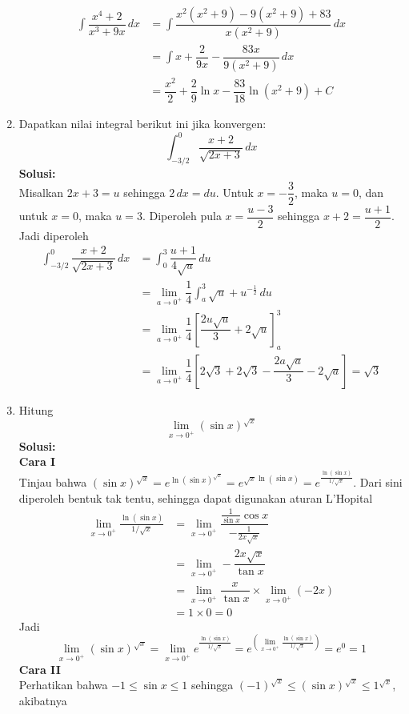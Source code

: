 \documentclass{article}
\begin{document}
\begin{enumerate}
\begin{align*}
	\int \dfrac{x^4+2}{x^3+9x}\, dx &= \int \dfrac{x^2(x^2+9)-9(x^2+9)+83}{x(x^2+9)}\, dx\\
	&= \int x + \dfrac{2}{9x} -\dfrac{83x}{9(x^2+9)}\, dx\\
	&= \dfrac{x^2}{2}+\dfrac{2}{9}\ln x-\dfrac{83}{18}\ln(x^2+9) + C
	\end{align*}
	\item Dapatkan nilai integral berikut ini jika konvergen:
	$$ \int_{-3/2}^0 \dfrac{x+2}{\sqrt{2x+3}}\, dx$$
	\textbf{Solusi:}\\
	Misalkan $2x+3=u$ sehingga $2\, dx=du$. Untuk $x=-\dfrac{3}{2}$, maka $u=0$, dan untuk $x=0$, maka $u=3$. Diperoleh pula $x=\dfrac{u-3}{2}$ sehingga $x+2=\dfrac{u+1}{2}$. Jadi diperoleh 
	\begin{align*}
	\int_{-3/2}^0 \dfrac{x+2}{\sqrt{2x+3}}\, dx &= \int_0^3 \dfrac{u+1}{4\sqrt{u}} \, du\\
	&= \lim_{a\rightarrow 0^+} \dfrac{1}{4}\int_a^3 \sqrt{u} + u^{-\frac{1}{2}} \, du\\
	&= \lim_{a\rightarrow 0^+} \dfrac{1}{4}\left[\dfrac{2u\sqrt{u}}{3}+2\sqrt{u}\right]^3_a\\
	&= \lim_{a\rightarrow 0^+} \dfrac{1}{4}\left[2\sqrt{3}+2\sqrt{3} - \dfrac{2a\sqrt{a}}{3}-2\sqrt{a}\right] = \sqrt{3}
	\end{align*}
	\item Hitung $$ \lim_{x\rightarrow 0^+} (\sin x)^{\sqrt{x}} $$
	\textbf{Solusi:}\\
	\textbf{Cara I}\\
	Tinjau bahwa $(\sin x)^{\sqrt{x}}=e^{\ln(\sin x)^{\sqrt{x}}}=e^{\sqrt{x}\ln(\sin x)}=e^{\frac{\ln(\sin x)}{1/\sqrt{x}}}$. Dari sini diperoleh bentuk tak tentu, sehingga dapat digunakan aturan L'Hopital
	\begin{align*}
	\lim_{x\rightarrow 0^+} \frac{\ln(\sin x)}{1/\sqrt{x}} &= \lim_{x\rightarrow 0^+} \dfrac{\frac{1}{\sin x}\cos x}{-\frac{1}{2x\sqrt{x}}}\\
	&= \lim_{x\rightarrow 0^+} -\dfrac{2x\sqrt{x}}{\tan x}\\
	&= \lim_{x\rightarrow 0^+} \dfrac{x}{\tan x}\times \lim_{x\rightarrow 0^+} (-2x)\\
	&= 1\times 0 = 0 
	\end{align*}
	Jadi $$ \lim_{x\rightarrow 0^+} (\sin x)^{\sqrt{x}} = \lim_{x\rightarrow 0^+} e^{\frac{\ln(\sin x)}{1/\sqrt{x}}} = e^{\left(\lim_{x\rightarrow 0^+}\frac{\ln(\sin x)}{1/\sqrt{x}}\right)} = e^0 = 1 $$
	\textbf{Cara II}\\
	Perhatikan bahwa $-1\leq \sin x\leq 1$ sehingga $(-1)^{\sqrt{x}}\leq (\sin x)^{\sqrt{x}} \leq 1^{\sqrt{x}}$, akibatnya 

\end{enumerate}
\end{document}
